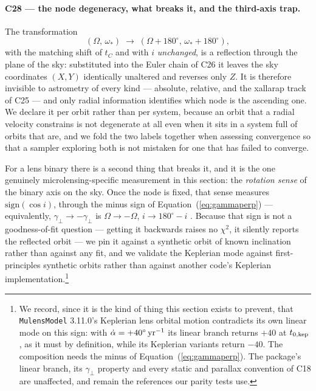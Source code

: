 \paragraph{C28 --- the node degeneracy, what breaks it, and the third-axis
trap.}  The transformation
\begin{equation}
  (\Omega,\, \omega_*) \;\longrightarrow\;
  (\Omega + 180^\circ,\, \omega_* + 180^\circ),
  \label{eq:nodefold}
\end{equation}
with the matching shift of $t_C$ and with $i$ \emph{unchanged}, is a
reflection through the plane of the sky: substituted into the Euler chain of
C26 it leaves the sky coordinates $(X, Y)$ identically unaltered and
reverses only $Z$.  It is therefore invisible to astrometry of every kind
--- absolute, relative, and the xallarap track of C25 --- and only radial
information identifies which node is the ascending one.  We declare it per
orbit rather than per system, because an orbit that a radial velocity
constrains is not degenerate at all even when it sits in a system full of
orbits that are, and we fold the two labels together when assessing
convergence so that a sampler exploring both is not mistaken for one that
has failed to converge.

For a lens binary there is a second thing that breaks it, and it is the one
genuinely microlensing-specific measurement in this section: the
\emph{rotation sense} of the binary axis on the sky.  Once the node is
fixed, that sense measures $\mathrm{sign}(\cos i)$, through the minus sign
of Equation~(\ref{eq:gammaperp}) --- equivalently, $\gamma_\perp
\rightarrow -\gamma_\perp$ is $\Omega \rightarrow -\Omega$, $i \rightarrow
180^\circ - i$ \citep[Section~5.2]{Skowron:2011}.  Because that sign is not
a goodness-of-fit question --- getting it backwards raises no $\chi^2$, it
silently reports the reflected orbit --- we pin it against a synthetic orbit
of known inclination rather than against any fit, and we validate the
Keplerian mode against first-principles synthetic orbits rather than against
another code's Keplerian implementation.\footnote{We record, since it is the
kind of thing this section exists to prevent, that \texttt{MulensModel}
3.11.0's Keplerian lens orbital motion contradicts its own linear mode on
this sign: with $\dot{\alpha} = +40^\circ\,{\rm yr}^{-1}$ its linear branch
returns $+40$ at $t_{0,\rm kep}$, as it must by definition, while its
Keplerian variants return $-40$.  The composition needs the minus of
Equation~(\ref{eq:gammaperp}).  The package's linear branch, its
$\gamma_\perp$ property and every static and parallax convention of C18 are
unaffected, and remain the references our parity tests use.}

